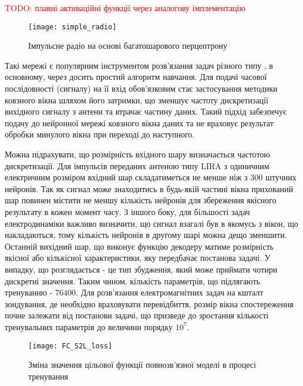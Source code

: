 \textcolor{red}{TODO: плавні активаційні функції через аналогову імплементацію}

\begin{figure}[htbp] \begin{center}
\texttt{[image: simple\_radio]}
\caption{Імпульсне радіо на основі багатошарового перцептрону} 
\label{fig:mp_radio}
\end{center} \end{figure}

Такі мережі є популярним інструментом розв'язання задач різного типу 
\cite{imp:Kussul2004}, в основному, через досить простий алгоритм навчання.
Для подачі часової послідовності (сигналу) на її вхід обов'язковим стає 
застосування методики ковзного вікна шляхом його затримки, що зменшує частоту
дискретизації вихідного сигналу з антени та втрачає частину 
даних. Такий підхід забезпечує подачу до нейронної мережі ковзного вікна даних 
та не враховує результат обробки минулого вікна при переході до наступного.

Можна підрахувати, що розмірність вхідного шару визначається частотою 
дискретизації. Для імпульсів переданих антеною типу LIRA з одиничним 
електричним розміром вхідний шар складатиметься не менше ніж з 300 штучних 
нейронів. Так як сигнал може знаходитись в будь-якій частині вікна прихований 
шар повинен містити не меншу кількість нейронів для збереження якісного 
результату в кожен момент часу. З іншого боку, для більшості задач 
електродинаміки важливо визначити, що сигнал взагалі був в якомусь з вікон,
що накладаються, тому кількість нейронів в другому шарі можна дещо зменшити.
Останній вихідний шар, що виконує функцію декодеру матиме розмірність 
якісної або кількісної характеристики, яку передбачає постанова задачі.
У випадку, що розглядається - це тип збудження, який може приймати чотири 
дискретні значення. Таким чином, кількість параметрів, що підлягають 
тренуванню - $ 76400 $. Для розв'язання електромагнітних задач на кшталт
зондування, де необхідно враховувати перевідбиття, розмір вікна спостереження
почне залежати від постанови задачі, що призведе до зростання кількості 
тренувальних параметрів до величини порядку $ 10^7 $.

\begin{figure}[htbp] \begin{center}
\texttt{[image: FC\_S2L\_loss]}
\caption{Зміна значення цільової функції повнозв'язної моделі  
в процесі тренування} \label{fig:fcnn_loss}
\end{center} \end{figure}

